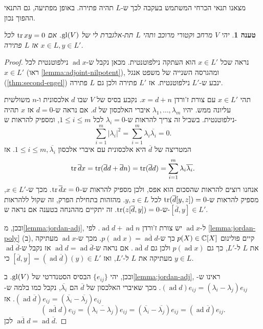 \documentclass{report}
\theoremstyle{break}
\newtheorem{preposition}[preposition]{טענה}
\theoremstyle{MyNonumberbreak}
\newtheorem{proof}{הוכחה}
\DeclareMathOperator{\ad}{ad} %
\begin{document}
מצאנו תנאי הכרחי המשתמש בעקבה לכך ש-$L$ תהיה פתירה. באופן מפתיעה, גם התנאי ההפוך נכון.
\begin{preposition} \label{prep:sufficient-solvable-tr}
	יהי $V$ מרחב וקטורי מרוכב ותהי $L$ תת-אלגברת לי של $\operatorname{gl}(V)$. אם $\operatorname{tr} xy = 0$ לכל $x \in L, y \in L'$ אז $L$ פתירה.
\end{preposition}
\begin{proof}
	נראה שכל $x \in L'$ הוא העתקה נילפוטנטית. מכאן נקבל ש-$\ad x$ נילפוטנטית לכל $x \in L'$ (ראו \autoref*{lemma:adjoint-nilpotent}), ומהגרסה השנייה של משפט אנגל (\autoref*{thm:second-engel}) ינבע ש-$L'$ נילפוטנטית. אז $L'$ פתירה ולכן גם $L$ פתירה.
	
	תהי $x \in L'$ עם צורת ז'ורדן $x = d + n$. נקבע בסיס של $V$ שבו $d$ אלכסונית ו-$n$ משולשית עליונה ממש. יהיו $\lambda_1, \ldots, \lambda_m$ איברי האלכסון של $d$. אם נראה ש-$d = 0$ אז $x$ תהיה נילפוטנטית. בשביל זה צריך להראות ש-$\lambda_i = 0$ לכל $1 \le i \le m$, ומספיק להראות ש-
	\[ \sum_{i=1}^m \lvert \lambda_i \rvert^2 = \sum_{i=1}^m \lambda_i \overline{\lambda_i} = 0. \]
	המטריצה של $\overline{d}$ היא אלכסונית עם איברי אלכסון $1 \le i \le m, \overline{\lambda_i}$. אז
	\[ \operatorname{tr} \overline{d}x = \operatorname{tr}(\overline{d}d + \overline{d}n) = \operatorname{tr}(\overline{d}d) = \sum_{i=1}^m \lambda_{i} \overline{\lambda_i}. \]
	אנחנו רוצים להראות שהסכום הוא אפס, ולכן מספיק להראות ש-$\operatorname{tr} \overline{d}x = 0$. מכך ש-$x \in L'$, מספיק להראות ש-$\operatorname{tr}(\overline{d}[y, z]) = 0$ לכל $y, z \in L$. מהזהות בתחילת הפרק, זה שקול ללהראות ש-$\operatorname{tr}(z[\overline{d}, y]) = 0$. זה יתקיים מההנחה בטענה אם נראה ש-$[\overline{d}, y] \in L'$.
	
	ובכן, מ\autoref*{lemma:jordan-adj}, ל-$\ad x$ יש צורת ז'ורדן $\ad d + \ad n$. לפי \autoref*{lemma:jordan-poly} (ב), קיים פולינום $p(X) \in \operatorname{\mathbb{C}}[X]$ כך ש-$p(\ad x) = \overline{\ad d}$. מכך ש-$\ad x$ מעתיקה את $L$ ל-$L'$, כך גם $p(\ad x)$ ולכן גם $\overline{\ad d}$. אם נראה ש-$\overline{\ad d} = \ad\overline{d}$ אז נקבל ש-$\ad\overline{d}$ מעתיקה את $L$ ל-$L'$, ואז $[\overline{d}, y] = (\ad\overline{d})(y) \in L'$ כי $y \in L$.
	
	ובכן, יהי $\{e_{ij}\}$ הבסיס הסטנדרטי של $\operatorname{gl}(V)$. ב\autoref*{lemma:jordan-adj}, ראינו ש-$(\ad d)e_{ij} = (\lambda_i - \lambda_j)e_{ij}$. מכך שאיברי האלכסון של $\overline{d}$ הם $\overline{\lambda_i}$, נקבל כמו בלמה ש-$(\ad\overline{d})e_{ij} = (\overline{\lambda_i} - \overline{\lambda_j})e_{ij}$. אז
	\[ (\overline{\ad d})e_{ij} = (\overline{\lambda_i - \lambda_j})e_{ij} = (\overline{\lambda_i} - \overline{\lambda_j})e_{ij} = (\ad\overline{d})e_{ij}. \]
	לכן $\overline{\ad d} = \ad\overline{d}$.
\end{proof}
\end{document}
